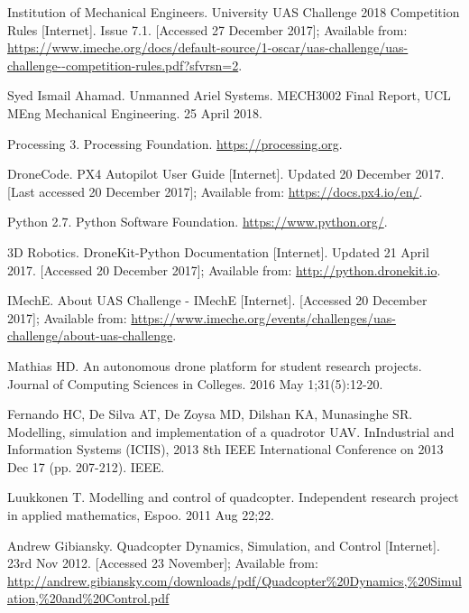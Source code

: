 \documentclass[11pt,twoside]{article}
\begin{document}
\newpage
\small
\begin{thebibliography}{11}

    Institution of Mechanical Engineers. University UAS Challenge 2018 Competition Rules [Internet]. Issue 7.1. [Accessed 27 December 2017]; Available from: \url{https://www.imeche.org/docs/default-source/1-oscar/uas-challenge/uas-challenge--competition-rules.pdf?sfvrsn=2}.

    Syed Ismail Ahamad. Unmanned Ariel Systems. MECH3002 Final Report, UCL MEng Mechanical Engineering. 25 April 2018.

    Processing 3. Processing Foundation. \url{https://processing.org}.

    DroneCode. PX4 Autopilot User Guide [Internet]. Updated 20 December 2017. [Last accessed 20 December 2017]; Available from: \url{https://docs.px4.io/en/}.

    Python 2.7. Python Software Foundation. \url{https://www.python.org/}.

    3D Robotics. DroneKit-Python Documentation [Internet]. Updated 21 April 2017. [Accessed 20 December 2017]; Available from: \url{http://python.dronekit.io}.

    IMechE. About UAS Challenge - IMechE [Internet]. [Accessed 20 December 2017]; Available from: \url{https://www.imeche.org/events/challenges/uas-challenge/about-uas-challenge}.

    Mathias HD. An autonomous drone platform for student research projects. Journal of Computing Sciences in Colleges. 2016 May 1;31(5):12-20.

    Fernando HC, De Silva AT, De Zoysa MD, Dilshan KA, Munasinghe SR. Modelling, simulation and implementation of a quadrotor UAV. InIndustrial and Information Systems (ICIIS), 2013 8th IEEE International Conference on 2013 Dec 17 (pp. 207-212). IEEE.

    Luukkonen T. Modelling and control of quadcopter. Independent research project in applied mathematics, Espoo. 2011 Aug 22;22.

    Andrew Gibiansky. Quadcopter Dynamics, Simulation, and Control [Internet]. 23rd Nov 2012. [Accessed 23 November]; Available from: \url{http://andrew.gibiansky.com/downloads/pdf/Quadcopter%20Dynamics,%20Simulation,%20and%20Control.pdf}


\end{thebibliography}
\end{document}
